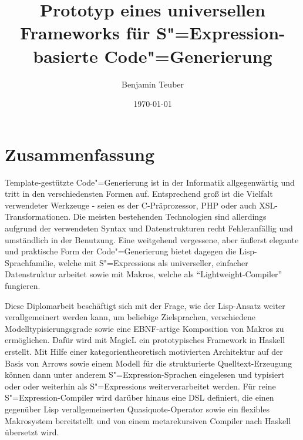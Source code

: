 \documentclass[11pt, a4paper, bibgerm]{scrbook}
\newcommand{\sexp}{S"=Expression}
\newcommand{\sexps}{S"=Expressions}
\newcommand{\cgen}{Code"=Generierung}
\begin{document}
\begin{titlepage}
\title{Prototyp eines universellen Frameworks für
  \sexp{}-basierte \cgen{}}
\author{Benjamin Teuber}
\date{\today}

\maketitle
\end{titlepage}
\thispagestyle{empty}


\section*{\centering Zusammenfassung}
Template-gestützte \cgen{} ist in der Informatik allgegenwärtig und
tritt in den verschiedensten Formen auf. Entsprechend groß ist die
Vielfalt verwendeter Werkzeuge - seien es der C-Präprozessor, PHP oder
auch XSL-Transformationen. Die meisten bestehenden Technologien sind
allerdings aufgrund der verwendeten Syntax und Datenstrukturen recht
Fehleranfällig und umständlich in der Benutzung. Eine weitgehend
vergessene, aber äußerst elegante und praktische Form der \cgen{} bietet
dagegen die Lisp-Sprachfamilie, welche mit \sexps{} als universeller,
einfacher Datenstruktur arbeitet sowie mit Makros, welche als
``Lightweight-Compiler'' fungieren.

Diese Diplomarbeit beschäftigt sich mit der Frage, wie der Lisp-Ansatz
weiter verallgemeinert werden kann, um beliebige Zielsprachen,
verschiedene Modelltypisierungsgrade sowie eine EBNF-artige Komposition
von Makros zu ermöglichen. Dafür wird mit MagicL ein prototypisches
Framework in Haskell erstellt. Mit Hilfe einer kategorientheoretisch
motivierten Architektur auf der Basis von Arrows sowie einem Modell für
die strukturierte Quelltext-Erzeugung können dann unter anderem
\sexp{}-Sprachen eingelesen und typisiert oder oder weiterhin als
\sexps{} weiterverarbeitet werden. Für reine \sexp{}-Compiler wird
darüber hinaus eine DSL definiert, die einen gegenüber Lisp
verallgemeinerten Quasiquote-Operator sowie ein flexibles Makrosystem
bereitstellt und von einem metarekursiven Compiler nach Haskell
übersetzt wird.

\cleardoublepage


\tableofcontents
\end{document}
